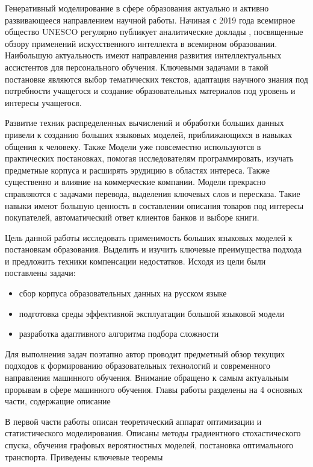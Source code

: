 Генеративный моделирование в сфере образования актуально и активно развивающееся направлением научной работы. 
Начиная с 2019 года всемирное общество UNESCO регулярно публикует аналитические доклады \cite{unesco2019beijing}\cite{annuvs2024education},
посвященные обзору применений искусственного интеллекта в всемирном образовании. Наибольшую актуальность имеют
направления развития интеллектуальных ассистентов для персонального обучения. Ключевыми задачами
в такой постановке являются выбор тематических текстов,
адаптация научного знания под потребности учащегося и 
создание образовательных материалов под уровень и интересы учащегося.

Развитие техник распределенных вычислений и обработки больших данных привели к 
созданию больших языковых моделей, приближающихся в навыках общения к человеку. Также Модели уже
повсеместно используются в практических постановках, помогая исследователям программировать, изучать предметные корпуса и 
расширять эрудицию в областях интереса. Также существенно и влияние на коммерческие компании.
Модели прекрасно справляются с задачами перевода, выделения ключевых слов и пересказа. Такие навыки имеют
большую ценность в составлении описания товаров под интересы покупателей, автоматический ответ клиентов банков и
выборе книги.


Цель данной работы исследовать применимость больших языковых моделей к постановкам образования. Выделить и изучить
ключевые преимущества подхода и предложить техники компенсации недостатков. Исходя из цели были поставлены задачи:
\begin{itemize}
    \item сбор корпуса образовательных данных на русском языке
    \item подготовка среды эффективной эксплуатации большой языковой модели
    \item разработка адаптивного алгоритма подбора сложности
\end{itemize}

Для выполнения задач поэтапно автор проводит предметный обзор текущих подходов к формированию образовательных технологий и
современного направления машинного обучения. Внимание обращено к самым актуальным прорывам в сфере машинного обучения. Главы работы разделены на 4 основных части, содержащие описание 

В первой части работы описан теоретический аппарат оптимизации и статистического моделирования. 
Описаны методы градиентного стохастического спуска, обучения графовых вероятностных моделей, постановка
оптимального транспорта. Приведены ключевые теоремы 


